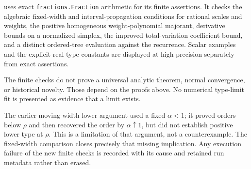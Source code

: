  uses exact \texttt{fractions.Fraction}
arithmetic for its finite assertions. It checks the algebraic
fixed-width and interval-propagation conditions for rational scales and
weights, the positive homogeneous weight-polynomial majorant, derivative
bounds on a normalized simplex, the improved total-variation coefficient
bound, and a distinct ordered-tree evaluation against the recurrence.
Scalar examples and the explicit real type constants are displayed at
high precision separately from exact assertions.

The finite checks do not prove a universal analytic theorem, normal
convergence, or historical novelty. Those depend on the proofs above. No
numerical type-limit fit is presented as evidence that a limit exists.

The earlier moving-width lower argument used a fixed \(\alpha<1\); it
proved orders below \(\rho\) and then recovered the order by
\(\alpha\uparrow1\), but did not establish positive lower type at
\(\rho\). This is a limitation of that argument, not a counterexample.
The fixed-width comparison closes precisely that missing implication.
Any execution failure of the new finite checks is recorded with its
cause and retained run metadata rather than erased.

